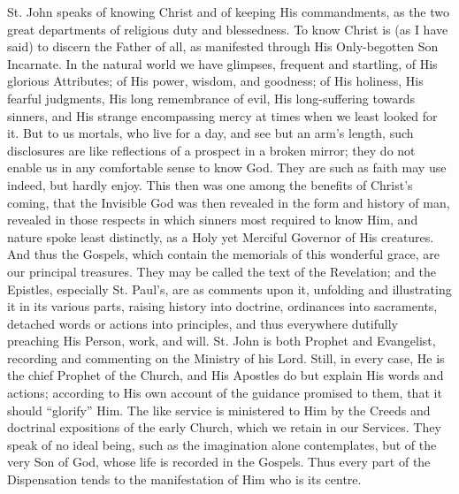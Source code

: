 St. John speaks of knowing Christ and of keeping His commandments, as
the two great departments of religious duty and blessedness. To know
Christ is (as I have said) to discern the Father of all, as manifested
through His Only-begotten Son Incarnate. In the natural world we have
glimpses, frequent and startling, of His glorious Attributes; of His
power, wisdom, and goodness; of His holiness, His fearful judgments, His
long remembrance of evil, His long-suffering towards sinners, and His
strange encompassing mercy at times when we least looked for it. But to
us mortals, who live for a day, and see but an arm's length, such
disclosures are like reflections of a prospect in a broken mirror; they
do not enable us in any comfortable sense to know God. They are such as
faith may use indeed, but hardly enjoy. This then was one among the
benefits of Christ's coming, that the Invisible God was then revealed in
the form and history of man, revealed in those respects in which sinners
most required to know Him, and nature spoke least distinctly, as a Holy
yet Merciful Governor of His creatures. And thus the Gospels, which
contain the memorials of this wonderful grace, are our principal
treasures. They may be called the text of the Revelation; and the
Epistles, especially St. Paul's, are as comments upon it, unfolding and
illustrating it in its various parts, raising history into doctrine,
ordinances into sacraments, detached words or actions into principles,
and thus everywhere dutifully preaching His Person, work, and will. St.
John is both Prophet and Evangelist, recording and commenting on the
Ministry of his Lord. Still, in every case, He is the chief Prophet of
the Church, and His Apostles do but explain His words and actions;
according to His own account of the guidance promised to them, that it
should ``glorify'' Him. The like service is ministered to Him by
the Creeds and doctrinal expositions of the early Church, which we
retain in our Services. They speak of no ideal being, such as the
imagination alone contemplates, but of the very Son of God, whose life
is recorded in the Gospels. Thus every part of the Dispensation tends to
the manifestation of Him who is its centre.

